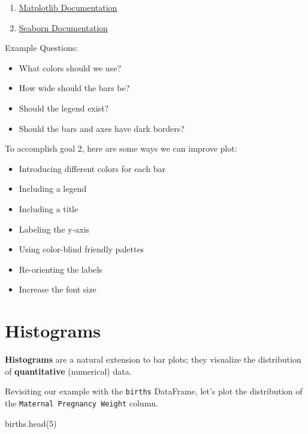 \documentclass[
  letterpaper,
  DIV=11,
  numbers=noendperiod]{scrreprt}
\newenvironment{Shaded}{\begin{snugshade}}{\end{snugshade}}
\newcommand{\DecValTok}[1]{\textcolor[rgb]{0.68,0.00,0.00}{#1}}
\newcommand{\NormalTok}[1]{\textcolor[rgb]{0.00,0.23,0.31}{#1}}
\providecommand{\tightlist}{%
  \setlength{\itemsep}{0pt}\setlength{\parskip}{0pt}}\usepackage{longtable,booktabs,array}
\begin{document}
\begin{enumerate}
\def\labelenumi{\arabic{enumi}.}
\tightlist
\item
  \href{https://matplotlib.org/stable/index.html}{Matplotlib
  Documentation}
\item
  \href{https://seaborn.pydata.org/}{Seaborn Documentation}
\end{enumerate}

Example Questions:

\begin{itemize}
\tightlist
\item
  What colors should we use?
\item
  How wide should the bars be?
\item
  Should the legend exist?
\item
  Should the bars and axes have dark borders?
\end{itemize}

To accomplish goal 2, here are some ways we can improve plot:

\begin{itemize}
\tightlist
\item
  Introducing different colors for each bar
\item
  Including a legend
\item
  Including a title
\item
  Labeling the y-axis
\item
  Using color-blind friendly palettes
\item
  Re-orienting the labels
\item
  Increase the font size
\end{itemize}

\hypertarget{histograms}{%
\section{Histograms}\label{histograms}}

\textbf{Histograms} are a natural extension to bar plots; they visualize
the distribution of \textbf{quantitative} (numerical) data.

Revisiting our example with the \texttt{births} DataFrame, let's plot
the distribution of the \texttt{Maternal\ Pregnancy\ Weight} column.

\begin{Shaded}
\begin{Highlighting}[]
\NormalTok{births.head(}\DecValTok{5}\NormalTok{)}
\end{Highlighting}
\end{Shaded}
\end{document}
